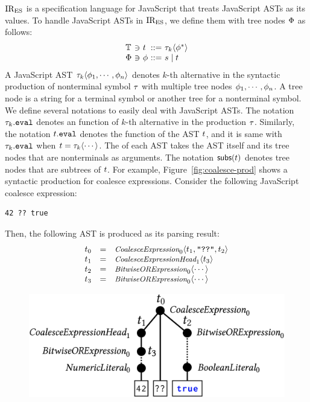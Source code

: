 $\text{IR}_\text{ES}$ is a specification language for JavaScript that treats JavaScript ASTs
as its values. To handle JavaScript ASTs in $\text{IR}_\text{ES}$, we define them with tree
nodes $\Phi$ as follows:
\[
  \begin{array}{l@{~}c@{~}l@{~}c@{~}l}
    \treeset &\ni& \tree &::=& \ty_k \langle \node^* \rangle\\
    \nodeset &\ni& \node &::=& \str \mid \tree\\
  \end{array}
\]
A JavaScript AST $\tau_k \langle \phi_1, \cdots, \phi_n \rangle$ denotes $k$-th
alternative in the syntactic production of nonterminal symbol $\tau$ with
multiple tree nodes $\phi_1, \cdots, \phi_n$.  A tree node is a string for a
terminal symbol or another tree for a nonterminal symbol. We define several
notations to easily deal with JavaScript ASTs.  The notation $\tau_k.\texttt{eval}$ denotes
an  function of $k$-th alternative in the production $\tau$.
Similarly, the notation $t.\texttt{eval}$ denotes the  function of
the AST $t$, and it is same with $\tau_k.\texttt{eval}$ when $t = \tau_k \langle
\cdots \rangle$. The  of each AST takes the AST itself and its
tree nodes that are nonterminals as arguments.  The notation $\textsf{subs}(t)$
denotes tree nodes that are subtrees of $t$.  For example,
Figure~\ref{fig:coalesce-prod} shows a syntactic production for coalesce
expressions.  Consider the following JavaScript coalesce expression:
\begin{lstlisting}[style=JS]
                    42 ?? true
\end{lstlisting}
Then, the following AST is produced as its parsing result:
\[
  \begin{array}{lcl}
    t_0 &=&
    \textit{\small CoalesceExpression}_0 \langle t_1, \texttt{"??"}, t_2 \rangle\\

    t_1 &=&
    \textit{\small CoalesceExpressionHead}_1 \langle t_3 \rangle\\

    t_2 &=&
    \textit{\small BitwiseORExpression}_0 \langle \cdots \rangle\\

    t_3 &=&
    \textit{\small BitwiseORExpression}_0 \langle \cdots \rangle\\
  \end{array}
\]
\begin{figure}[H]
  \includegraphics[width=.8\columnwidth]{img/ast-example.png}
\end{figure}
